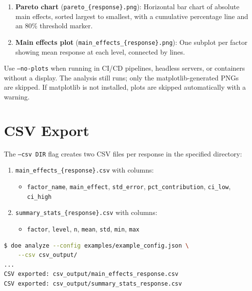 \documentclass[11pt]{book}
\begin{document}
\begin{enumerate}
  \item \textbf{Pareto chart} (\texttt{pareto\_\{response\}.png}): Horizontal bar chart of absolute main effects, sorted largest to smallest, with a cumulative percentage line and an 80\% threshold marker.
  \item \textbf{Main effects plot} (\texttt{main\_effects\_\{response\}.png}): One subplot per factor showing mean response at each level, connected by lines.
\end{enumerate}

\begin{keypoint}
Use \texttt{--no-plots} when running in CI/CD pipelines, headless servers, or containers without a display. The analysis still runs; only the matplotlib-generated PNGs are skipped. If matplotlib is not installed, plots are skipped automatically with a warning.
\end{keypoint}

\section{CSV Export}

The \texttt{--csv DIR} flag creates two CSV files per response in the specified directory:

\begin{enumerate}
  \item \texttt{main\_effects\_\{response\}.csv} with columns:
    \begin{itemize}[nosep]
      \item \texttt{factor\_name}, \texttt{main\_effect}, \texttt{std\_error}, \texttt{pct\_contribution}, \texttt{ci\_low}, \texttt{ci\_high}
    \end{itemize}
  \item \texttt{summary\_stats\_\{response\}.csv} with columns:
    \begin{itemize}[nosep]
      \item \texttt{factor}, \texttt{level}, \texttt{n}, \texttt{mean}, \texttt{std}, \texttt{min}, \texttt{max}
    \end{itemize}
\end{enumerate}

\begin{example}
\begin{lstlisting}[language=bash]
$ doe analyze --config examples/example_config.json \
    --csv csv_output/
...
CSV exported: csv_output/main_effects_response.csv
CSV exported: csv_output/summary_stats_response.csv
\end{lstlisting}
\end{example}
\end{document}
